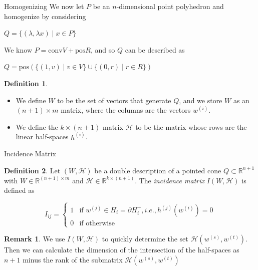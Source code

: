 \documentclass[9pt]{beamer}
\newcommand\R{\mathbb{R}}
\newcommand\set[1]{\{#1\}}
\theoremstyle{definition}
\newtheorem{remark}{Remark}
\newtheorem{defn}{Definition}
\begin{document}


\begin{frame}[fragile]{Homogenizing}
  We now let $P$ be an $n$-dimensional point polyhedron and homogenize by considering
  \begin{center}
    $Q  = \set{(\lambda, \lambda x) \mid x \in P}$
  \end{center}
  We know $P = \text{conv}V + \text{pos}R$, and so $Q$ can be described as
  \begin{center}
    $Q = \text{pos}(\set{(1, v) \mid v \in V} \cup \set{(0, r) \mid r \in R})$
  \end{center}
  \begin{defn}
    \begin{itemize}
      \item We define $W$ to be the set of vectors that generate $Q$, and we store $W$
    as an $(n+1) \times m$ matrix, where the columns are the vectors $w^{(i)}$.\\
    \item We define the $k \times(n+1)$ matrix $\mathcal{H}$ to be the matrix whose
      rows are the linear half-spaces $h^{(i)}$.
    \end{itemize}
  \end{defn}
\end{frame}


\begin{frame}[fragile]{Incidence Matrix}
  \begin{defn}
    Let $(W, \mathcal{H})$ be a double description of a pointed cone $Q \subset \R^{n+1}$
    with $W \in \R^{(n+1) \times m}$ and $\mathcal{H} \in \R^{k \times (n+1)}$. The \emph{incidence matrix} $I(W, \mathcal{H})$ is defined as
    
    \begin{equation}
      I_{ij}=
      \begin{cases}
        1 & \text{if } w^{(j)} \in H_i = \partial H_i^+, i.e., h^{(j)} (w^{(i)}) = 0\\
        0 & \text{if } \text{otherwise}
      \end{cases}
    \end{equation}
  \end{defn}
  \begin{remark}
    We use $I(W, \mathcal{H})$ to quickly determine the set $\mathcal{H}(w^{(s)}, w^{(t)})$. Then we can calculate the dimension of the intersection of the half-spaces as $n+1$ minus the rank of the submatrix $\mathcal{H}(w^{(s)}, w^{(t)})$
  \end{remark}
\end{frame}
\end{document}
